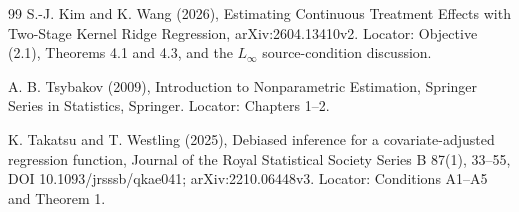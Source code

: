 \documentclass{article}
\begin{document}
\begin{thebibliography}{99}
   S.-J. Kim and K. Wang (2026), Estimating Continuous Treatment Effects with Two-Stage Kernel Ridge Regression, arXiv:2604.13410v2. Locator: Objective (2.1), Theorems 4.1 and 4.3, and the \(L_\infty\) source-condition discussion.

   A. B. Tsybakov (2009), Introduction to Nonparametric Estimation, Springer Series in Statistics, Springer. Locator: Chapters 1--2.

   K. Takatsu and T. Westling (2025), Debiased inference for a covariate-adjusted regression function, Journal of the Royal Statistical Society Series B 87(1), 33--55, DOI 10.1093/jrsssb/qkae041; arXiv:2210.06448v3. Locator: Conditions A1--A5 and Theorem 1.

\end{thebibliography}
\end{document}
